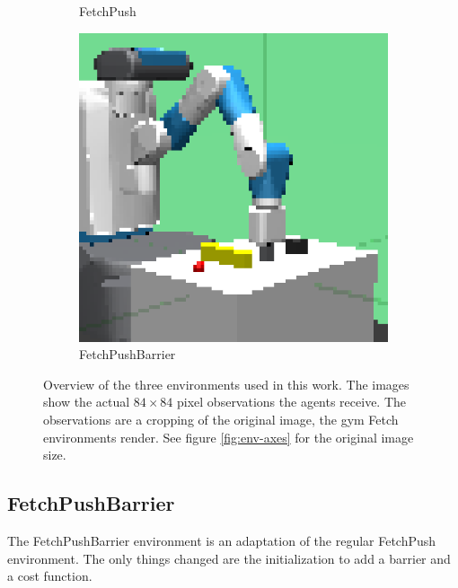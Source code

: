 \begin{figure}[btp]
\begin{subfigure}[b]{.32\textwidth}
        \caption{FetchPush}
        \label{fig:envs:push}
    \end{subfigure}
    \hfill
    \begin{subfigure}[b]{.32\textwidth}
        \centering
        \includegraphics[width=\textwidth]{images/environments/fetch-push-barrier-obs.png}
        \caption{FetchPushBarrier}
        \label{fig:envs:barrier}
    \end{subfigure}
    \caption[Overview of the three environments used in this work.]{Overview of the three environments used in this work. The images show the actual $84\times84$ pixel observations the agents receive. The observations are a cropping of the original image, the gym Fetch environments render. See figure \ref{fig:env-axes} for the original image size.}
    \label{fig:envs-overview}
\end{figure}

\subsection{FetchPushBarrier}
\label{sec:environments:fetch-push-barrier}

The FetchPushBarrier environment is an adaptation of the regular FetchPush environment. The only things changed are the initialization to add a barrier and a cost function.

